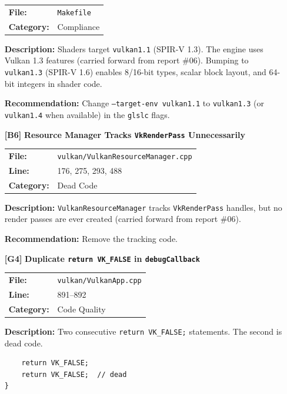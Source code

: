 \documentclass[a4paper,12pt]{article}
\newcommand{\severitybox}[2]{%
  \colorbox{#1}{\makebox[2.5cm][c]{\textcolor{white}{\textbf{#2}}}}%
}
\begin{document}
\begin{enumerate}[leftmargin=*]
  \begin{tabular}{ll}
    \textbf{File:} & \texttt{Makefile} \\
    \textbf{Category:} & Compliance \\
  \end{tabular}

  \textbf{Description:}
  Shaders target \texttt{vulkan1.1} (SPIR-V 1.3). The engine uses Vulkan 1.3
  features (carried forward from report \#06). Bumping to \texttt{vulkan1.3}
  (SPIR-V 1.6) enables 8/16-bit types, scalar block layout, and 64-bit
  integers in shader code.

  \textbf{Recommendation:}
  Change \texttt{--target-env vulkan1.1} to \texttt{vulkan1.3} (or
  \texttt{vulkan1.4} when available) in the \texttt{glslc} flags.

\item[\textbf{[B6]}] \textbf{Resource Manager Tracks \texttt{VkRenderPass} Unnecessarily}
  \hfill \severitybox{lowcolor}{LOW}

  \begin{tabular}{ll}
    \textbf{File:} & \texttt{vulkan/VulkanResourceManager.cpp} \\
    \textbf{Line:} & 176, 275, 293, 488 \\
    \textbf{Category:} & Dead Code \\
  \end{tabular}

  \textbf{Description:}
  \texttt{VulkanResourceManager} tracks \texttt{VkRenderPass} handles, but
  no render passes are ever created (carried forward from report \#06).

  \textbf{Recommendation:}
  Remove the tracking code.

\item[\textbf{[G4]}] \textbf{Duplicate \texttt{return VK\_FALSE} in \texttt{debugCallback}}
  \hfill \severitybox{lowcolor}{LOW}

  \begin{tabular}{ll}
    \textbf{File:} & \texttt{vulkan/VulkanApp.cpp} \\
    \textbf{Line:} & 891--892 \\
    \textbf{Category:} & Code Quality \\
  \end{tabular}

  \textbf{Description:}
  Two consecutive \texttt{return VK\_FALSE;} statements. The second is dead
  code.

\begin{lstlisting}
    return VK_FALSE;
    return VK_FALSE;  // dead
}
\end{lstlisting}


\end{enumerate}
\end{document}
